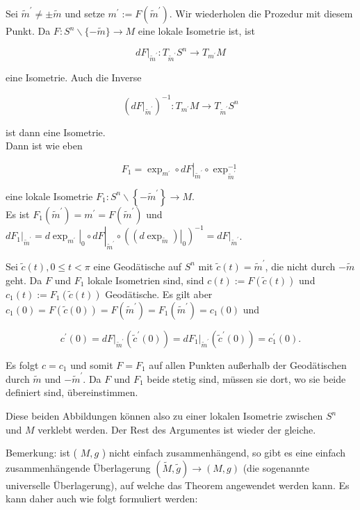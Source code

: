 \documentclass[10pt, letterpaper]{article}
\begin{document}
Sei $\tilde{m}^{\prime} \neq \pm \tilde{m}$ und setze $m^{\prime}:=F\left(\tilde{m}^{\prime}\right)$. Wir wiederholen die Prozedur mit diesem Punkt. Da $F: S^{n} \backslash\{-\tilde{m}\} \rightarrow M$ eine lokale Isometrie ist, ist

$$
\left.d F\right|_{\tilde{m}^{\prime}}: T_{\tilde{m}^{\prime}} S^{n} \rightarrow T_{m^{\prime}} M
$$

eine Isometrie. Auch die Inverse

$$
\left(\left.d F\right|_{\tilde{m}^{\prime}}\right)^{-1}: T_{m^{\prime}} M \rightarrow T_{\tilde{m}^{\prime}} S^{n}
$$

ist dann eine Isometrie.\\
Dann ist wie eben

$$
F_{1}=\left.\exp _{m^{\prime}} \circ d F\right|_{\tilde{m}^{\prime}} \circ \exp _{\tilde{m}^{\prime}}^{-1}
$$

eine lokale Isometrie $F_{1}: S^{n} \backslash\left\{-\tilde{m}^{\prime}\right\} \rightarrow M$.\\
Es ist $F_{1}\left(\tilde{m}^{\prime}\right)=m^{\prime}=F\left(\tilde{m}^{\prime}\right)$ und $\left.d F_{1}\right|_{\tilde{m}^{\prime}}=\left.\left.d \exp _{m^{\prime}}\right|_{0} \circ d F\right|_{\tilde{m}^{\prime}} \circ\left(\left.\left(d \exp _{\tilde{m}}\right)\right|_{0}\right)^{-1}=\left.d F\right|_{\tilde{m}^{\prime}}$.

Sei $\tilde{c}(t), 0 \leq t<\pi$ eine Geodätische auf $S^{n}$ mit $\tilde{c}(t)=\tilde{m}^{\prime}$, die nicht durch $-\tilde{m}$ geht. Da $F$ und $F_{1}$ lokale Isometrien sind, sind $c(t):=F(\tilde{c}(t))$ und $c_{1}(t):=F_{1}(\tilde{c}(t))$ Geodätische. Es gilt aber $c_{1}(0)=F(\tilde{c}(0))=F\left(\tilde{m}^{\prime}\right)=F_{1}\left(\tilde{m}^{\prime}\right)=c_{1}(0)$ und

$$
c^{\prime}(0)=\left.d F\right|_{\tilde{m}^{\prime}}\left(\tilde{c}^{\prime}(0)\right)=\left.d F_{1}\right|_{\tilde{m}^{\prime}}\left(\tilde{c}^{\prime}(0)\right)=c_{1}^{\prime}(0) .
$$

Es folgt $c=c_{1}$ und somit $F=F_{1}$ auf allen Punkten außerhalb der Geodätischen durch $\tilde{m}$ und $-\tilde{m}^{\prime}$. Da $F$ und $F_{1}$ beide stetig sind, müssen sie dort, wo sie beide definiert sind, übereinstimmen.

Diese beiden Abbildungen können also zu einer lokalen Isometrie zwischen $S^{n}$ und $M$ verklebt werden. Der Rest des Argumentes ist wieder der gleiche.

Bemerkung: ist ( $M, g$ ) nicht einfach zusammenhängend, so gibt es eine einfach zusammenhängende Überlagerung $(\tilde{M}, \tilde{g}) \rightarrow(M, g)$ (die sogenannte universelle Überlagerung), auf welche das Theorem angewendet werden kann. Es kann daher auch wie folgt formuliert werden:
\end{document}
